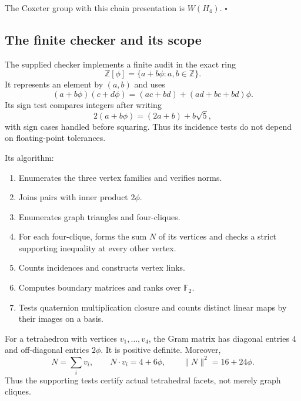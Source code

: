 \documentclass[
  10pt,
  a4paper,
]{article}
\providecommand{\tightlist}{%
  \setlength{\itemsep}{0pt}\setlength{\parskip}{0pt}}
\begin{document}
The Coxeter group with this chain presentation is \(W(H_4)\).
\(\square\)

\subsection{The finite checker and its
scope}\label{the-finite-checker-and-its-scope}

The supplied checker implements a finite audit in the exact ring
\begin{equation}
\mathbb Z[\phi]=\{a+b\phi:a,b\in\mathbb Z\}.
\end{equation} It represents an element by \((a,b)\) and uses
\begin{equation}
(a+b\phi)(c+d\phi)
=(ac+bd)+(ad+bc+bd)\phi.
\end{equation} Its sign test compares integers after writing
\begin{equation}
2(a+b\phi)=(2a+b)+b\sqrt5,
\end{equation} with sign cases handled before squaring. Thus its
incidence tests do not depend on floating-point tolerances.

Its algorithm:

\begin{enumerate}
\def\labelenumi{\arabic{enumi}.}
\tightlist
\item
  Enumerates the three vertex families and verifies norms.
\item
  Joins pairs with inner product \(2\phi\).
\item
  Enumerates graph triangles and four-cliques.
\item
  For each four-clique, forms the sum \(N\) of its vertices and checks a
  strict supporting inequality at every other vertex.
\item
  Counts incidences and constructs vertex links.
\item
  Computes boundary matrices and ranks over \(\mathbb F_2\).
\item
  Tests quaternion multiplication closure and counts distinct linear
  maps by their images on a basis.
\end{enumerate}

For a tetrahedron with vertices \(v_1,\ldots,v_4\), the Gram matrix has
diagonal entries \(4\) and off-diagonal entries \(2\phi\). It is
positive definite. Moreover, \begin{equation}
N=\sum_i v_i,\qquad
N\cdot v_i=4+6\phi,\qquad
\|N\|^2=16+24\phi.
\end{equation} Thus the supporting tests certify actual tetrahedral
facets, not merely graph cliques.
\end{document}
